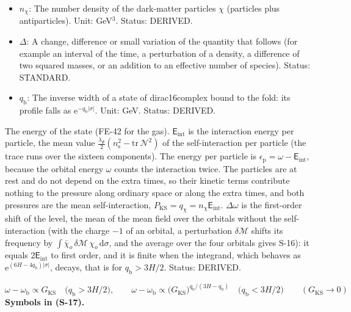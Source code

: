 \documentclass[
  10pt,
]{article}
\begin{document}
\begin{itemize}
  gas). Unit: GeV\(^4\). Status: DERIVED.
\item
  \(n_\chi\): The number density of the dark-matter particles \(\chi\)
  (particles plus antiparticles). Unit: GeV\(^3\). Status: DERIVED.
\item
  \(\Delta\): A change, difference or small variation of the quantity
  that follows (for example an interval of the time, a perturbation of a
  density, a difference of two squared masses, or an addition to an
  effective number of species). Status: STANDARD.
\item
  \(q_{\mathrm{b}}\): The inverse width of a state of dirac16complex
  bound to the fold: its profile falls as
  \(\mathrm{e}^{-q_{\mathrm{b}}\lvert\sigma\rvert}\). Unit: GeV. Status:
  DERIVED.
\end{itemize}

The energy of the state (FE-42 for the gas).
\(\mathsf{E}_{\mathrm{int}}\) is the interaction energy per particle,
the mean value
\(\frac{\lambda_\Psi}{2}(n_{\mathrm{s}}^2 - \mathrm{tr}\,\mathcal{N}^2)\)
of the self-interaction per particle (the trace runs over the sixteen
components). The energy per particle is
\(\epsilon_{\mathrm{p}} = \omega - \mathsf{E}_{\mathrm{int}}\), because
the orbital energy \(\omega\) counts the interaction twice. The
particles are at rest and do not depend on the extra times, so their
kinetic terms contribute nothing to the pressure along ordinary space or
along the extra times, and both pressures are the mean self-interaction,
\(P_{\mathrm{KS}} = q_\chi = n_\chi\mathsf{E}_{\mathrm{int}}\).
\(\Delta\omega\) is the first-order shift of the level, the mean of the
mean field over the orbitals without the self-interaction (with the
charge \(-1\) of an orbital, a perturbation \(\delta\mathcal{M}\) shifts
its frequency by
\(\int\bar\chi_o\,\delta\mathcal{M}\,\chi_o\,\mathrm{d}\sigma\), and the
average over the four orbitals gives S-16): it equals
\(2\mathsf{E}_{\mathrm{int}}\) to first order, and it is finite when the
integrand, which behaves as
\(\mathrm{e}^{(6H - 4q_{\mathrm{b}})\lvert\sigma\rvert}\), decays, that
is for \(q_{\mathrm{b}} > 3H/2\). Status: DERIVED.

\[
\omega - \omega_{\mathrm{b}} \propto G_{\mathrm{KS}}\quad\big(q_{\mathrm{b}} > 3H/2\big),\qquad
\omega - \omega_{\mathrm{b}} \propto \big(G_{\mathrm{KS}}\big)^{q_{\mathrm{b}}/(3H - q_{\mathrm{b}})}\quad\big(q_{\mathrm{b}} < 3H/2\big)\qquad(G_{\mathrm{KS}} \to 0) \tag{S-17}
\] \textbf{Symbols in (S-17).}
\end{document}
